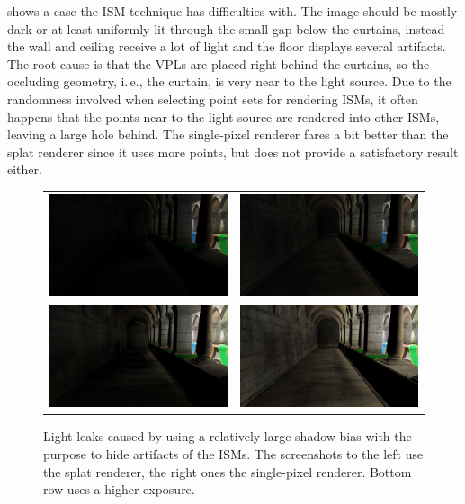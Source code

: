  shows a case the ISM technique has difficulties with. The image should be mostly dark or at least uniformly lit through the small gap below the curtains, instead the wall and ceiling receive a lot of light and the floor displays several artifacts. The root cause is that the VPLs are placed right behind the curtains, so the occluding geometry, i.\,e., the curtain, is very near to the light source. Due to the randomness involved when selecting point sets for rendering ISMs, it often happens that the points near to the light source are rendered into other ISMs, leaving a large hole behind. The single-pixel renderer fares a bit better than the splat renderer since it uses more points, but does not provide a satisfactory result either.



\begin{figure}[htb]
\centering
  \begin{tabular}{@{}cc@{}}
    \includegraphics[width=.48\textwidth]{screenshots/bias_splat} &
    \includegraphics[width=.48\textwidth]{screenshots/bias_single_pixel}\\
      \includegraphics[width=.48\textwidth]{screenshots/bias_splat_exposure} &
      \includegraphics[width=.48\textwidth]{screenshots/bias_single_pixel_exposure}
  \end{tabular}
  \caption{Light leaks caused by using a relatively large shadow bias with the purpose to hide artifacts of the ISMs. The screenshots to the left use the splat renderer, the right ones the single-pixel renderer. Bottom row uses a higher exposure.}
  \label{fig:results:bias}
\end{figure}

